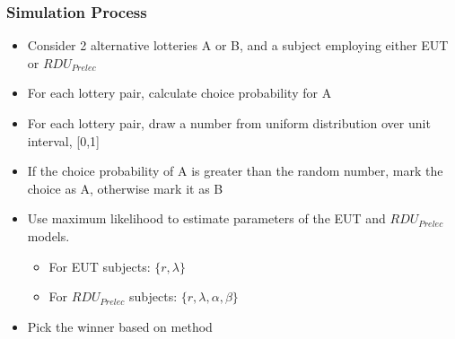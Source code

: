 \documentclass{beamer}
\newcommand\Prob{\ensuremath{\mathit{Pr}}}  %
\begin{document}
\begin{frame}
\frametitle{Simulation Process}
\begin{itemize}
	\item Consider 2 alternative lotteries A or B, and a subject employing either EUT or $\mathit{RDU_{Prelec}}$
	\item For each lottery pair, calculate choice probability for A
	\item For each lottery pair, draw a number from uniform distribution over unit interval, [0,1]
	\item If the choice probability of A is greater than the random number, mark the choice as A, otherwise mark it as B
	\item Use maximum likelihood to estimate parameters of the EUT and $\mathit{RDU_{Prelec}}$ models.
		\begin{itemize}
			\item For EUT subjects: $\lbrace r, \lambda \rbrace$
			\item For $\mathit{RDU_{Prelec}}$ subjects: $\lbrace r, \lambda, \alpha, \beta \rbrace$
		\end{itemize}
	\item Pick the winner based on \textcite{Harrison2016} method
\end{itemize}
\end{frame}
%
%
\end{document}
